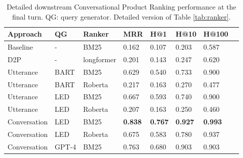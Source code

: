 \begin{table}[t]  \small
\centering
\setlength{\tabcolsep}{0.8pt} %
\renewcommand{\arraystretch}{1.0} %
\begin{tabular}{llllllll}
\hline
\textbf{Approach} & \textbf{QG} & \textbf{Ranker} & \textbf{MRR} & \textbf{H@1} & \textbf{H@10} & \textbf{H@100}\\ \hline
Baseline & - & BM25& 0.162 & 0.107 & 0.203 & 0.587 \\ \hline \hline
D2P & - & longformer & 0.201 & 0.143  & 0.247 & 0.620 \\ \hline
Utterance & BART & BM25& 0.629 & 0.540  & 0.733 & 0.900 \\
Utterance & BART & Roberta& 0.217 & 0.163 & 0.270 & 0.477\\ \hline
Utterance & LED & BM25& 0.667 & 0.593 & 0.740 & 0.900 \\
Utterance & LED & Roberta& 0.207 & 0.163 & 0.250 & 0.460 \\ \hline
Conversation & LED & BM25& \textbf{0.838} & \textbf{0.767}  & \textbf{0.927} & \textbf{0.993} \\
Conversation & LED & Roberta & 0.675 & 0.583  & 0.780 & 0.937 \\ \hline \hline
Conversation & GPT-4 & BM25 & 0.763 & 0.680 & 0.903 & 0.903 \\ \hline 
\end{tabular}
\caption{Detailed downstream Conversational Product Ranking performance at the final turn. QG: query generator. Detailed version of Table \ref{tab:ranker}.}
\label{tab:detailed_ranker}
\end{table}


